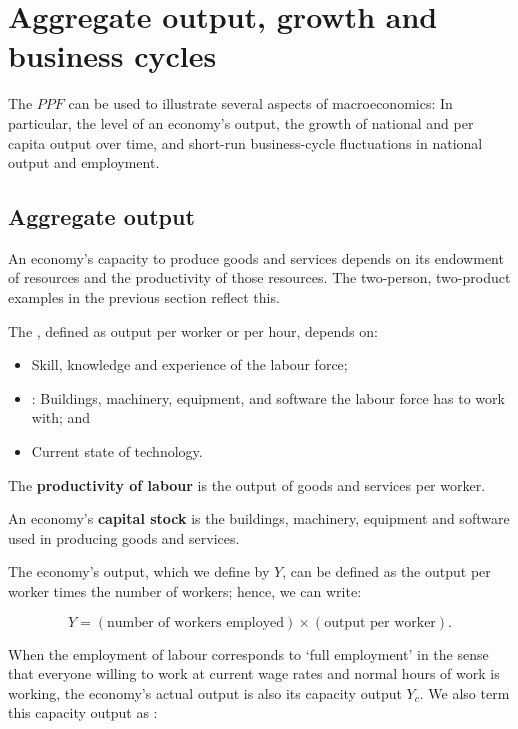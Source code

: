 \section{Aggregate output, growth and business cycles}\label{sec:ch1sec6}

The $PPF$ can be used to illustrate several aspects of macroeconomics: In
particular, the level of an economy's output, the growth of national and per
capita output over time, and short-run business-cycle fluctuations in
national output and employment.

\subsection*{Aggregate output}

An economy's capacity to produce goods and services depends on its endowment
of resources and the productivity of those resources. The two-person,
two-product examples in the previous section reflect this.

The , defined as output per worker or
per hour, depends on:

\begin{itemize}
	\item Skill, knowledge and experience of the labour force;
	
	\item {}: Buildings, machinery, equipment, and
	software the labour force has to work with; and
	
	\item Current state of technology.
\end{itemize}

\begin{DefBox}
	The \textbf{productivity of labour} is the output of goods and services per worker.
	
	An economy's \textbf{capital stock} is the buildings, machinery, equipment and software used in producing goods and services.
\end{DefBox}

The economy's output, which we define by $Y$, can be defined as the output
per worker times the number of workers; hence, we can write:

\[
Y=(\text{number of workers employed})\times(\text{output per worker}).
\]

\newhtmlpage

When the employment of labour corresponds to `full employment' in the sense
that everyone willing to work at current wage rates and normal hours of work
is working, the economy's actual output is also its capacity output $Y_c$.
We also term this capacity output as :

